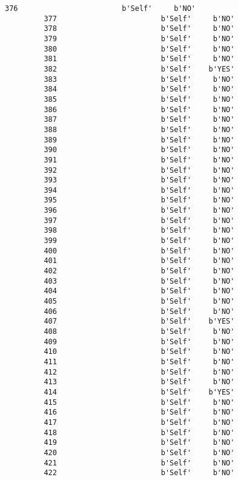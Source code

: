 \documentclass[11pt]{article}
\begin{document}
\begin{Verbatim}[commandchars=\\\{\}]
         376                        b'Self'     b'NO'  
         377                        b'Self'     b'NO'  
         378                        b'Self'     b'NO'  
         379                        b'Self'     b'NO'  
         380                        b'Self'     b'NO'  
         381                        b'Self'     b'NO'  
         382                        b'Self'    b'YES'  
         383                        b'Self'     b'NO'  
         384                        b'Self'     b'NO'  
         385                        b'Self'     b'NO'  
         386                        b'Self'     b'NO'  
         387                        b'Self'     b'NO'  
         388                        b'Self'     b'NO'  
         389                        b'Self'     b'NO'  
         390                        b'Self'     b'NO'  
         391                        b'Self'     b'NO'  
         392                        b'Self'     b'NO'  
         393                        b'Self'     b'NO'  
         394                        b'Self'     b'NO'  
         395                        b'Self'     b'NO'  
         396                        b'Self'     b'NO'  
         397                        b'Self'     b'NO'  
         398                        b'Self'     b'NO'  
         399                        b'Self'     b'NO'  
         400                        b'Self'     b'NO'  
         401                        b'Self'     b'NO'  
         402                        b'Self'     b'NO'  
         403                        b'Self'     b'NO'  
         404                        b'Self'     b'NO'  
         405                        b'Self'     b'NO'  
         406                        b'Self'     b'NO'  
         407                        b'Self'    b'YES'  
         408                        b'Self'     b'NO'  
         409                        b'Self'     b'NO'  
         410                        b'Self'     b'NO'  
         411                        b'Self'     b'NO'  
         412                        b'Self'     b'NO'  
         413                        b'Self'     b'NO'  
         414                        b'Self'    b'YES'  
         415                        b'Self'     b'NO'  
         416                        b'Self'     b'NO'  
         417                        b'Self'     b'NO'  
         418                        b'Self'     b'NO'  
         419                        b'Self'     b'NO'  
         420                        b'Self'     b'NO'  
         421                        b'Self'     b'NO'  
         422                        b'Self'     b'NO'  

\end{Verbatim}
\end{document}
